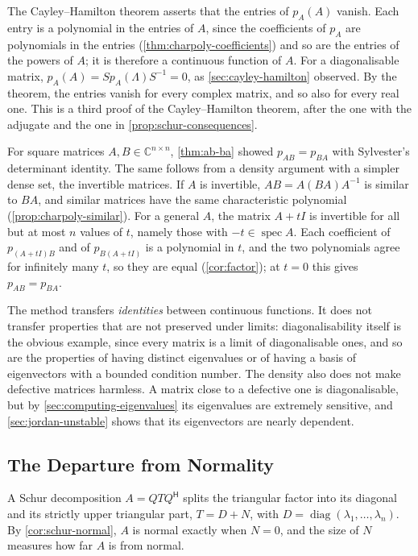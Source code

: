 The Cayley--Hamilton theorem asserts that the entries of $p_A(A)$ vanish. Each entry is a polynomial in the entries of $A$, since the coefficients of $p_A$ are polynomials in the entries (\cref{thm:charpoly-coefficients}) and so are the entries of the powers of $A$; it is therefore a continuous function of $A$. For a diagonalisable matrix, $p_A(A)=Sp_A(\Lambda)S^{-1}=0$, as \cref{sec:cayley-hamilton} observed. By the theorem, the entries vanish for every complex matrix, and so also for every real one. This is a third proof of the Cayley--Hamilton theorem, after the one with the adjugate and the one in \cref{prop:schur-consequences}.

For square matrices $A,B\in\mathbb C^{n\times n}$, \cref{thm:ab-ba} showed $p_{AB}=p_{BA}$ with Sylvester's determinant identity. The same follows from a density argument with a simpler dense set, the invertible matrices. If $A$ is invertible, $AB=A(BA)A^{-1}$ is similar to $BA$, and similar matrices have the same characteristic polynomial (\cref{prop:charpoly-similar}). For a general $A$, the matrix $A+tI$ is invertible for all but at most $n$ values of $t$, namely those with $-t\in\operatorname{spec}A$. Each coefficient of $p_{(A+tI)B}$ and of $p_{B(A+tI)}$ is a polynomial in $t$, and the two polynomials agree for infinitely many $t$, so they are equal (\cref{cor:factor}); at $t=0$ this gives $p_{AB}=p_{BA}$.

The method transfers \emph{identities} between continuous functions. It does not transfer properties that are not preserved under limits: diagonalisability itself is the obvious example, since every matrix is a limit of diagonalisable ones, and so are the properties of having distinct eigenvalues or of having a basis of eigenvectors with a bounded condition number. The density also does not make defective matrices harmless. A matrix close to a defective one is diagonalisable, but by \cref{sec:computing-eigenvalues} its eigenvalues are extremely sensitive, and \cref{sec:jordan-unstable} shows that its eigenvectors are nearly dependent.

\subsection{The Departure from Normality}

A Schur decomposition $A=QTQ^{\mathsf H}$ splits the triangular factor into its diagonal and its strictly upper triangular part, $T=D+N$, with $D=\operatorname{diag}(\lambda_1,\ldots,\lambda_n)$. By \cref{cor:schur-normal}, $A$ is normal exactly when $N=0$, and the size of $N$ measures how far $A$ is from normal.

